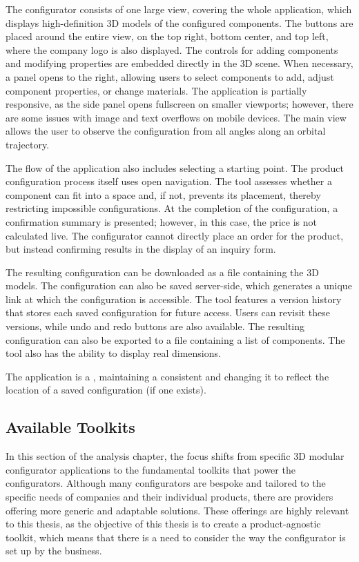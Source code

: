 The configurator consists of one large view, covering the whole application, which displays high-definition 3D models of the configured components. The buttons are placed around the entire view, on the top right, bottom center, and top left, where the company logo is also displayed.  The controls for adding components and modifying properties are embedded directly in the 3D scene. When necessary, a panel opens to the right, allowing users to select components to add, adjust component properties, or change materials. The application is partially responsive, as the side panel opens fullscreen on smaller viewports; however, there are some issues with image and text overflows on mobile devices. The main view allows the user to observe the configuration from all angles along an orbital trajectory.

The flow of the application also includes selecting a starting point. The product configuration process itself uses open navigation. The tool assesses whether a component can fit into a space and, if not, prevents its placement, thereby restricting impossible configurations. At the completion of the configuration, a confirmation summary is presented; however, in this case, the price is not calculated live. The configurator cannot directly place an order for the product, but instead confirming results in the display of an inquiry form.

The resulting configuration can be downloaded as a file containing the 3D models. The configuration can also be saved server-side, which generates a unique link at which the configuration is accessible. The tool features a version history that stores each saved configuration for future access. Users can revisit these versions, while undo and redo buttons are also available. The resulting configuration can also be exported to a  file containing a list of components. The tool also has the ability to display real dimensions.

The application is a , maintaining a consistent  and changing it to reflect the location of a saved configuration (if one exists).


\subsection{Available Toolkits}

In this section of the analysis chapter, the focus shifts from specific 3D modular configurator applications to the fundamental toolkits that power the configurators. Although many configurators are bespoke and tailored to the specific needs of companies and their individual products, there are providers offering more generic and adaptable solutions. These offerings are highly relevant to this thesis, as the objective of this thesis is to create a product-agnostic toolkit, which means that there is a need to consider the way the configurator is set up by the business.

